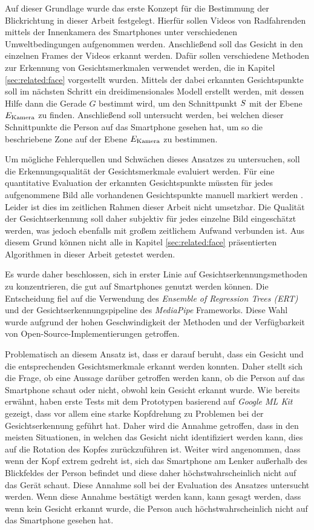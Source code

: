 Auf dieser Grundlage wurde das erste Konzept für die Bestimmung der Blickrichtung in dieser Arbeit festgelegt. Hierfür sollen Videos von Radfahrenden mittels der Innenkamera des Smartphones unter verschiedenen Umweltbedingungen aufgenommen werden. Anschließend soll das Gesicht in den einzelnen Frames der Videos erkannt werden. Dafür sollen verschiedene Methoden zur Erkennung von Gesichtsmerkmalen verwendet werden, die in Kapitel \ref{sec:related:face} vorgestellt wurden. Mittels der dabei erkannten Gesichtspunkte soll im nächsten Schritt ein dreidimensionales Modell erstellt werden, mit dessen Hilfe dann die Gerade $G$ bestimmt wird, um den Schnittpunkt $S$ mit der Ebene $E_{\text{Kamera}}$ zu finden. Anschließend soll untersucht werden, bei welchen dieser Schnittpunkte die Person auf das Smartphone gesehen hat, um so die beschriebene Zone auf der Ebene $E_{\text{Kamera}}$ zu bestimmen.

Um mögliche Fehlerquellen und Schwächen dieses Ansatzes zu untersuchen, soll die Erkennungsqualität der Gesichtsmerkmale evaluiert werden. Für eine quantitative Evaluation der erkannten Gesichtspunkte müssten für jedes aufgenommene Bild alle vorhandenen Gesichtspunkte manuell markiert werden \cite{paper:face:survey}. Leider ist dies im zeitlichen Rahmen dieser Arbeit nicht umsetzbar. Die Qualität der Gesichtserkennung soll daher subjektiv für jedes einzelne Bild eingeschätzt werden, was jedoch ebenfalls mit großem zeitlichem Aufwand verbunden ist. Aus diesem Grund können nicht alle in Kapitel \ref{sec:related:face} präsentierten Algorithmen in dieser Arbeit getestet werden.

Es wurde daher beschlossen, sich in erster Linie auf Gesichtserkennungsmethoden zu konzentrieren, die gut auf Smartphones genutzt werden können. Die Entscheidung fiel auf die Verwendung des \textit{Ensemble of Regression Trees (ERT)} und der Gesichtserkennungspipeline des \textit{MediaPipe} Frameworks. Diese Wahl wurde aufgrund der hohen Geschwindigkeit der Methoden und der Verfügbarkeit von Open-Source-Implementierungen getroffen.

Problematisch an diesem Ansatz ist, dass er darauf beruht, dass ein Gesicht und die entsprechenden Gesichtsmerkmale erkannt werden konnten. Daher stellt sich die Frage, ob eine Aussage darüber getroffen werden kann, ob die Person auf das Smartphone schaut oder nicht, obwohl kein Gesicht erkannt wurde. Wie bereits erwähnt, haben erste Tests mit dem Prototypen basierend auf \textit{Google ML Kit} gezeigt, dass vor allem eine starke Kopfdrehung zu Problemen bei der Gesichtserkennung geführt hat. Daher wird die Annahme getroffen, dass in den meisten Situationen, in welchen das Gesicht nicht identifiziert werden kann, dies auf die Rotation des Kopfes zurückzuführen ist. Weiter wird angenommen, dass wenn der Kopf extrem gedreht ist, sich das Smartphone am Lenker außerhalb des Blickfeldes der Person befindet und diese daher höchstwahrscheinlich nicht auf das Gerät schaut. Diese Annahme soll bei der Evaluation des Ansatzes untersucht werden. Wenn diese Annahme bestätigt werden kann, kann gesagt werden, dass wenn kein Gesicht erkannt wurde, die Person auch höchstwahrscheinlich nicht auf das Smartphone gesehen hat.

